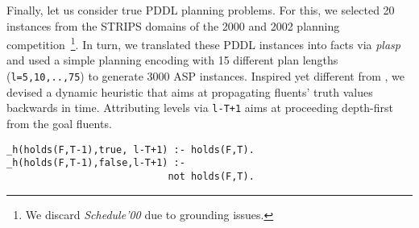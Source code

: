 Finally, let us consider true PDDL planning problems.
For this, we selected 20 instances from the%
STRIPS domains of the 2000 and 2002 planning competition~\cite{icaps-competition}\footnote{We discard \textit{Schedule'00} due to grounding issues.}.
In turn, we translated these PDDL instances into facts via \textit{plasp}~\cite{gekaknsc11a}
and used a simple planning encoding with 15 different plan lengths (\verb+l=5,10,..,75+) to generate 3000 ASP instances.
%
Inspired yet different from \cite{rintanen12a}, we devised a dynamic heuristic that aims at propagating fluents' truth values backwards in time.
Attributing levels via \texttt{l-T+1} aims at proceeding depth-first from the goal fluents.
\begin{lstlisting}
_h(holds(F,T-1),true, l-T+1) :- holds(F,T).
_h(holds(F,T-1),false,l-T+1) :-
                            not holds(F,T).
\end{lstlisting}
\setlength{\textfloatsep}{5pt plus 1.0pt minus 2.0pt}
\newcommand{\pdata}[3]{&\,\ignorespaces#1$s$&(\ignorespaces#2/\ignorespaces#3)}
\newcommand{\sdata}[3]{&\,\ignorespaces#1$s$&(\ignorespaces#3)}
